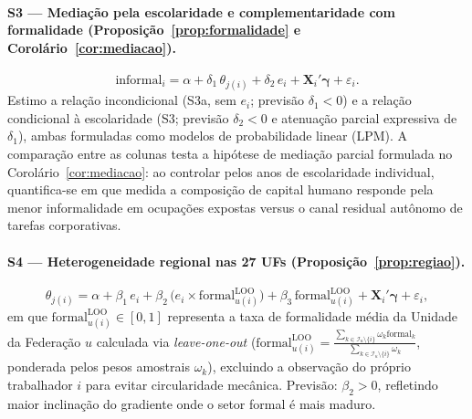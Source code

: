 \paragraph{S3 --- Mediação pela escolaridade e complementaridade com formalidade (Proposição~\ref{prop:formalidade} e Corolário~\ref{cor:mediacao}).}
\begin{equation}
    \text{informal}_i = \alpha + \delta_1 \, \theta_{j(i)} + \delta_2 \, e_i
    + \mathbf{X}_i' \boldsymbol{\gamma} + \varepsilon_i.
    \label{eq:s3}
\end{equation}
Estimo a relação incondicional (S3a, sem $e_i$; previsão $\delta_1 < 0$) e a relação condicional à escolaridade (S3; previsão $\delta_2 < 0$ e atenuação parcial expressiva de $\delta_1$), ambas formuladas como modelos de probabilidade linear (LPM). A comparação entre as colunas testa a hipótese de mediação parcial formulada no Corolário~\ref{cor:mediacao}: ao controlar pelos anos de escolaridade individual, quantifica-se em que medida a composição de capital humano responde pela menor informalidade em ocupações expostas versus o canal residual autônomo de tarefas corporativas.

\paragraph{S4 --- Heterogeneidade regional nas 27 UFs (Proposição~\ref{prop:regiao}).}
\begin{equation}
    \theta_{j(i)} = \alpha + \beta_1 \, e_i + \beta_2 \, \big(e_i \times \text{formal}_{u(i)}^{\text{LOO}}\big)
    + \beta_3 \, \text{formal}_{u(i)}^{\text{LOO}} + \mathbf{X}_i' \boldsymbol{\gamma} + \varepsilon_i,
    \label{eq:s4}
\end{equation}
em que $\text{formal}_{u(i)}^{\text{LOO}} \in [0, 1]$ representa a taxa de formalidade média da Unidade da Federação $u$ calculada via \emph{leave-one-out} ($\text{formal}_{u(i)}^{\text{LOO}} = \frac{\sum_{k \in \mathcal{I}_u \setminus \{i\}} \omega_k \text{formal}_k}{\sum_{k \in \mathcal{I}_u \setminus \{i\}} \omega_k}$, ponderada pelos pesos amostrais $\omega_k$), excluindo a observação do próprio trabalhador $i$ para evitar circularidade mecânica. Previsão: $\beta_2 > 0$, refletindo maior inclinação do gradiente onde o setor formal é mais maduro.
